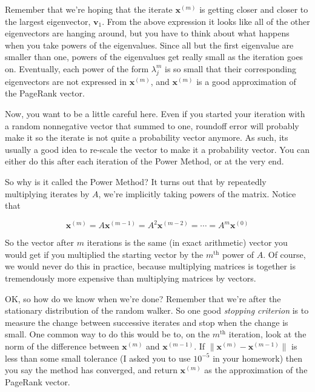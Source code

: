 \documentclass[12pt]{article}
\newcommand{\iter}[1]{^{\myp{#1}}}
\newcommand{\nin}{\noindent}
\newcommand{\vthree}{\vspace{3mm}}
\newcommand{\myp}[1]{\left( #1 \right)}
\newcommand{\bx}{\mathbf{x}}
\newcommand{\bv}{\mathbf{v}}
\begin{document}
\vthree

\nin Remember that we're hoping that the iterate $\bx\iter{m}$ is getting closer and closer to the largest eigenvector, $\bv_1$.  From the above expression it looks like all of the other eigenvectors are hanging around, but you have to think about what happens when you take powers of the eigenvalues.  Since all but the first eigenvalue are smaller than one, powers of the eigenvalues get really small as the iteration goes on.  Eventually, each power of the form $\lambda_j^m$ is so small that their corresponding eigenvectors are not expressed in $\bx\iter{m}$, and $\bx\iter{m}$ is a good approximation of the PageRank vector.

\vthree

\nin Now, you want to be a little careful here.  Even if you started your iteration with a random nonnegative vector that summed to one, roundoff error will probably make it so the iterate is not quite a probability vector anymore.  As such, its usually a good idea to re-scale the vector to make it a probability vector.  You can either do this after each iteration of the Power Method, or at the very end.

\vthree

\nin So why is it called the Power Method?  It turns out that by repeatedly multiplying iterates by $A$, we're implicitly taking powers of the matrix.  Notice that

\[
\bx\iter{m} = A\bx\iter{m-1} = A^2\bx\iter{m-2} = \cdots = A^m\bx\iter{0}
\]

\vthree

\nin So the vector after $m$ iterations is the same (in exact arithmetic) vector you would get if you multiplied the starting vector by the $m^\textrm{th}$ power of $A$.  Of course, we would never do this in practice, because multiplying matrices is together is tremendously more expensive than multiplying matrices by vectors.

\clearpage

\nin OK, so how do we know when we're done?  Remember that we're after the stationary distribution of the random walker.  So one good {\it stopping criterion} is to measure the change between successive iterates and stop when the change is small.  One common way to do this would be to, on the $m^\textrm{th}$ iteration, look at the norm of the difference between $\bx\iter{m}$ and $\bx\iter{m-1}$.  If $\|\bx\iter{m} - \bx\iter{m-1}\|$ is less than some small tolerance (I asked you to use $10^{-5}$ in your homework) then you say the method has converged, and return $\bx\iter{m}$ as the approximation of the PageRank vector.
\end{document}
